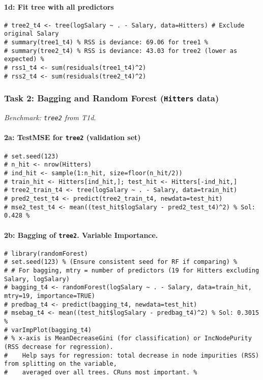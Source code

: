 \documentclass[12pt,a4paper]{article}
\newcommand{\Robject}[1]{\texttt{#1}} %
\newcommand{\Rcode}[1]{\texttt{#1}} %
\begin{document}
            \paragraph{1d: Fit tree with all predictors }
\begin{lstlisting}
# tree2_t4 <- tree(logSalary ~ . - Salary, data=Hitters) # Exclude original Salary
# summary(tree1_t4) % RSS is deviance: 69.06 for tree1 %
# summary(tree2_t4) % RSS is deviance: 43.03 for tree2 (lower as expected) %
# rss1_t4 <- sum(residuals(tree1_t4)^2)
# rss2_t4 <- sum(residuals(tree2_t4)^2)
\end{lstlisting}

        \subsubsection{Task 2: Bagging and Random Forest (\Robject{Hitters} data)}
            \textit{Benchmark: \Rcode{tree2} from T1d.}
            \paragraph{2a: TestMSE for \Rcode{tree2} (validation set)}
\begin{lstlisting}
# set.seed(123)
# n_hit <- nrow(Hitters)
# ind_hit <- sample(1:n_hit, size=floor(n_hit/2))
# train_hit <- Hitters[ind_hit,]; test_hit <- Hitters[-ind_hit,]
# tree2_train_t4 <- tree(logSalary ~ . - Salary, data=train_hit)
# pred2_test_t4 <- predict(tree2_train_t4, newdata=test_hit)
# mse2_test_t4 <- mean((test_hit$logSalary - pred2_test_t4)^2) % Sol: 0.428 %
\end{lstlisting}
            \paragraph{2b: Bagging of \Rcode{tree2}. Variable Importance.}
\begin{lstlisting}
# library(randomForest)
# set.seed(123) % (Ensure consistent seed for RF if comparing) %
# # For bagging, mtry = number of predictors (19 for Hitters excluding Salary, logSalary)
# bagging_t4 <- randomForest(logSalary ~ . - Salary, data=train_hit, mtry=19, importance=TRUE)
# predbag_t4 <- predict(bagging_t4, newdata=test_hit)
# msebag_t4 <- mean((test_hit$logSalary - predbag_t4)^2) % Sol: 0.3015 %
# varImpPlot(bagging_t4)
# % x-axis is MeanDecreaseGini (for classification) or IncNodePurity (RSS decrease for regression).
#    Help says for regression: total decrease in node impurities (RSS) from splitting on the variable,
#    averaged over all trees. CRuns most important. %
\end{lstlisting}
\end{document}
